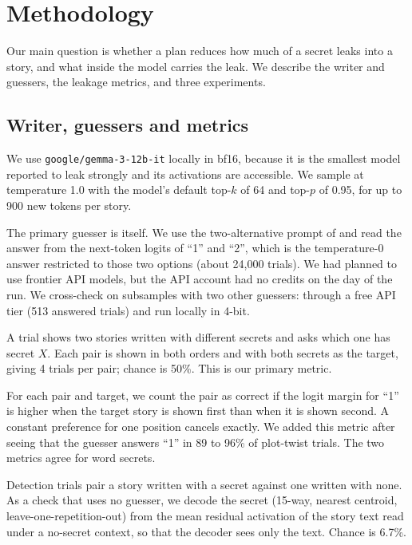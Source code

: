 \section{Methodology}
\label{sec:method}

Our main question is whether a plan reduces how much of a secret leaks into a story, and what inside the model carries the leak.
We describe the writer and guessers, the leakage metrics, and three experiments.

\subsection{Writer, guessers and metrics}

We use \texttt{google/gemma-3-12b-it} locally in bf16, because it is the smallest model reported to leak strongly \citep{holtzman2026secret} and its activations are accessible.
We sample at temperature 1.0 with the model's default top-$k$ of 64 and top-$p$ of 0.95, for up to 900 new tokens per story.

The primary guesser is \gemma itself.
We use the two-alternative prompt of \citet{holtzman2026secret} and read the answer from the next-token logits of ``1'' and ``2'', which is the temperature-0 answer restricted to those two options (about 24,000 trials).
We had planned to use frontier API models, but the API account had no credits on the day of the run.
We cross-check on subsamples with two other guessers: \nemotron through a free API tier (513 answered trials) and \gemmabig run locally in 4-bit.

A trial shows two stories written with different secrets and asks which one has secret $X$.
Each pair is shown in both orders and with both secrets as the target, giving 4 trials per pair; chance is 50\%.
This is our primary metric.

For each pair and target, we count the pair as correct if the logit margin for ``1'' is higher when the target story is shown first than when it is shown second.
A constant preference for one position cancels exactly.
We added this metric after seeing that the guesser answers ``1'' in 89 to 96\% of plot-twist trials.
The two metrics agree for word secrets.

Detection trials pair a story written with a secret against one written with none.
As a check that uses no guesser, we decode the secret (15-way, nearest centroid, leave-one-repetition-out) from the mean residual activation of the story text read under a no-secret context, so that the decoder sees only the text.
Chance is 6.7\%.

